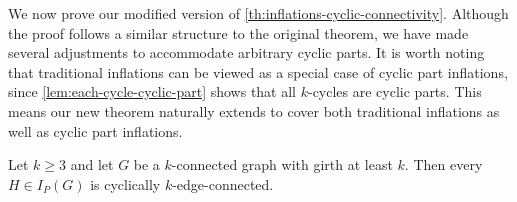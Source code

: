 \documentclass[12pt, twoside]{book}
\begin{document}
We now prove our modified version of \cref{th:inflations-cyclic-connectivity}. Although the proof follows a similar structure to the original theorem, we have made several adjustments to accommodate arbitrary cyclic parts. It is worth noting that traditional inflations can be viewed as a special case of cyclic part inflations, since \cref{lem:each-cycle-cyclic-part} shows that all $k$-cycles are cyclic parts. This means our new theorem naturally extends to cover both traditional inflations as well as cyclic part inflations.

\begin{theorem}\label{th:cyclic-part-inflations}
	Let $k\geq 3$ and let $G$ be a $k$-connected graph with girth at least $k$. Then every  $H\in I_P(G)$ is cyclically $k$-edge-connected.
\end{theorem}
\end{document}
